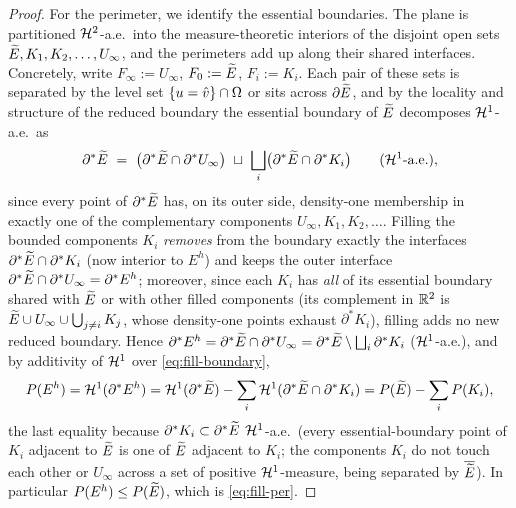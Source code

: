 \begin{proof}
For the perimeter, we identify the essential boundaries. The plane is
partitioned $\mathcal{H}^2$-a.e.\ into the measure-theoretic interiors of the
disjoint open sets $\widetilde{E},K_1,K_2,\dots,U_\infty$, and the perimeters add up
along their shared interfaces. Concretely, write $F_\infty:=U_\infty$,
$F_0:=\widetilde{E}$, $F_i:=K_i$. Each pair of these sets is separated by the level
set $\left\{u=\hat v\right\}\cap\Omega$ or sits across $\partial\widetilde{E}$, and by the locality
and structure of the reduced boundary \cite[Thm.~16.3, \S16.2]{Maggi2012} the
essential boundary of $\widetilde{E}$ decomposes $\mathcal{H}^1$-a.e.\ as
\begin{equation}\label{eq:fill-boundary}
   \partial^*\widetilde{E}\ =\ \bigl(\partial^*\widetilde{E}\cap\partial^*U_\infty\bigr)
   \ \sqcup\ \bigsqcup_i\bigl(\partial^*\widetilde{E}\cap\partial^*K_i\bigr)
   \qquad(\mathcal{H}^1\text{-a.e.}),
\end{equation}
since every point of $\partial^*\widetilde{E}$ has, on its outer side, density-one
membership in exactly one of the complementary components $U_\infty,K_1,K_2,
\dots$. Filling the bounded components $K_i$ \emph{removes} from the boundary
exactly the interfaces $\partial^*\widetilde{E}\cap\partial^*K_i$ (now interior to
$E^h$) and keeps the outer interface $\partial^*\widetilde{E}\cap\partial^*U_\infty=
\partial^*E^h$; moreover, since each $K_i$ has \emph{all} of its essential
boundary shared with $\widetilde{E}$ or with other filled components (its complement
in $\mathbb{R}^2$ is $\widetilde{E}\cup U_\infty\cup\bigcup_{j\ne i}K_j$, whose density-one
points exhaust $\partial^*K_i$), filling adds no new reduced boundary. Hence
$\partial^*E^h=\partial^*\widetilde{E}\cap\partial^*U_\infty=\partial^*\widetilde{E}
\setminus\bigsqcup_i\partial^*K_i$ ($\mathcal{H}^1$-a.e.), and by additivity of
$\mathcal{H}^1$ over \eqref{eq:fill-boundary},
\begin{equation}\label{eq:fill-perimexact}
   P(E^h)=\mathcal{H}^1(\partial^*E^h)
   =\mathcal{H}^1(\partial^*\widetilde{E})-\sum_i\mathcal{H}^1(\partial^*\widetilde{E}\cap\partial^*K_i)
   =P(\widetilde{E})-\sum_iP(K_i),
\end{equation}
the last equality because $\partial^*K_i\subset\partial^*\widetilde{E}$ $\mathcal{H}^1$-a.e.\
(every essential-boundary point of $K_i$ adjacent to $\widetilde{E}$ is one of
$\widetilde{E}$ adjacent to $K_i$; the components $K_i$ do not touch each other or
$U_\infty$ across a set of positive $\mathcal{H}^1$-measure, being separated by
$\overline{\widetilde{E}}$). In particular $P(E^h)\le P(\widetilde{E})$, which is
\eqref{eq:fill-per}.


\end{proof}
